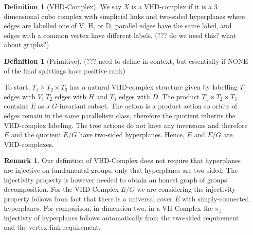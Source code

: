 \documentclass[12pt,parskip=full]{report}
\theoremstyle{plain}
\theoremstyle{definition}
\newtheorem{rmk}[thm]{Remark}
\newtheorem{dfn}[thm]{Definition}
\begin{document}
\begin{dfn}
    [VHD-Complex]
    \label{dfn:vhd}
    We say \(X\) is a VHD-complex if it is a 3 dimensional cube complex with simplicial links and two-sided hyperplanes where edges are labelled one of V, H, or D, parallel edges have the same label, and edges with a common vertex have different labels. (??? do we need this? what about graphs?)
\end{dfn}

\begin{dfn}
    [Primitive]
    \label{dfn:primitive}
    (??? need to define in context, but essentially if NONE of the final splittings have positive rank)
\end{dfn}

To start, \(T_1\times T_2\times T_3\) has a natural VHD-complex structure given by labelling \(T_1\) edges with \(V\), \(T_2\) edges with \(H\) and \(T_3\) edges with \(D\). The product \(T_1\times T_2\times T_3\) contains \(E\) as a \(G\)-invariant subset. The action is a product action so orbits of edges remain in the same parallelism class, therefore the quotient inherits the VHD-complex labeling. The tree actions do not have any inversions and therefore \(E\) and the quotient \(E/G\) have two-sided hyperplanes. Hence, \(E\) and \(E/G\) are VHD-complexes.


\begin{rmk}
    Our definition of VHD-Complex does not require that hyperplanes are injective on fundamental groups, only that hyperplanes are two-sided. The injectivity property is  however needed to obtain an honest graph of groups decomposition. For the VHD-Complex \(E/G\) we are considering the injectivity property follows from fact that there is a universal cover \(E\) with simply-connected hyperplanes. For comparison, in dimension two, in a VH-Complex the \(\pi_1\)-injectivty of hyperplanes follows automatically from the two-sided requirement and the vertex link requirement.
\end{rmk}
\end{document}
